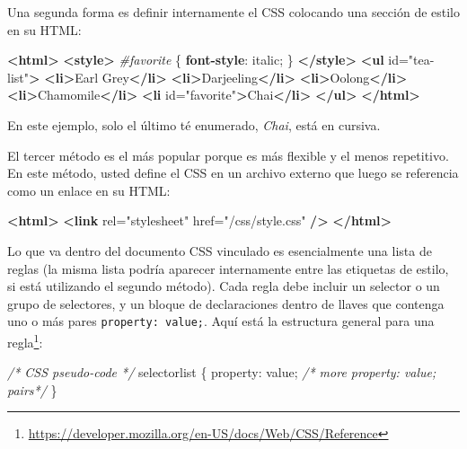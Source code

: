 \documentclass[12pt,]{krantz}
\makeatletter
\newenvironment{Shaded}{\begin{snugshade}}{\end{snugshade}}
\newcommand{\CommentTok}[1]{\textcolor[rgb]{0.56,0.35,0.01}{\textit{#1}}}
\newcommand{\DecValTok}[1]{\textcolor[rgb]{0.00,0.00,0.81}{#1}}
\newcommand{\KeywordTok}[1]{\textcolor[rgb]{0.13,0.29,0.53}{\textbf{#1}}}
\newcommand{\NormalTok}[1]{#1}
\newcommand{\OtherTok}[1]{\textcolor[rgb]{0.56,0.35,0.01}{#1}}
\newcommand{\PreprocessorTok}[1]{\textcolor[rgb]{0.56,0.35,0.01}{\textit{#1}}}
\newcommand{\StringTok}[1]{\textcolor[rgb]{0.31,0.60,0.02}{#1}}
\renewcommand{\href}[2]{#2\footnote{\url{#1}}}
\newenvironment{kframe}{%
\medskip{}
\setlength{\fboxsep}{.8em}
 \def\at@end@of@kframe{}%
 \ifinner\ifhmode%
  \def\at@end@of@kframe{\end{minipage}}%
  \begin{minipage}{\columnwidth}%
 \fi\fi%
 \def\FrameCommand##1{\hskip\@totalleftmargin \hskip-\fboxsep
 \colorbox{shadecolor}{##1}\hskip-\fboxsep
     \hskip-\linewidth \hskip-\@totalleftmargin \hskip\columnwidth}%
 \MakeFramed {\advance\hsize-\width
   \@totalleftmargin\z@ \linewidth\hsize
   \@setminipage}}%
 {\par\unskip\endMakeFramed%
 \at@end@of@kframe}
\renewenvironment{Shaded}{\begin{kframe}}{\end{kframe}}
\theoremstyle{definition}
\theoremstyle{definition}
\theoremstyle{definition}
\theoremstyle{remark}
\makeatother
\begin{document}
Una segunda forma es definir internamente el CSS colocando una sección
de estilo en su HTML:

\begin{Shaded}
\begin{Highlighting}[]
\KeywordTok{<html>}
\KeywordTok{<style>} 
\PreprocessorTok{#favorite}\NormalTok{ \{}
    \KeywordTok{font-style}\NormalTok{: }\DecValTok{italic}\NormalTok{;}
\NormalTok{\}}
\KeywordTok{</style>}
\KeywordTok{<ul}\OtherTok{ id=}\StringTok{"tea-list"}\KeywordTok{>}
  \KeywordTok{<li>}\NormalTok{Earl Grey}\KeywordTok{</li>}
  \KeywordTok{<li>}\NormalTok{Darjeeling}\KeywordTok{</li>}
  \KeywordTok{<li>}\NormalTok{Oolong}\KeywordTok{</li>}
  \KeywordTok{<li>}\NormalTok{Chamomile}\KeywordTok{</li>}
  \KeywordTok{<li}\OtherTok{ id=}\StringTok{"favorite"}\KeywordTok{>}\NormalTok{Chai}\KeywordTok{</li>}
\KeywordTok{</ul>}
\KeywordTok{</html>}
\end{Highlighting}
\end{Shaded}

En este ejemplo, solo el último té enumerado, \emph{Chai}, está en
cursiva.

El tercer método es el más popular porque es más flexible y el menos
repetitivo. En este método, usted define el CSS en un archivo externo
que luego se referencia como un enlace en su HTML:

\begin{Shaded}
\begin{Highlighting}[]
\KeywordTok{<html>}
    \KeywordTok{<link}\OtherTok{ rel=}\StringTok{"stylesheet"}\OtherTok{ href=}\StringTok{"/css/style.css"} \KeywordTok{/>}
\KeywordTok{</html>}
\end{Highlighting}
\end{Shaded}

Lo que va dentro del documento CSS vinculado es esencialmente una lista
de reglas (la misma lista podría aparecer internamente entre las
etiquetas de estilo, si está utilizando el segundo método). Cada regla
debe incluir un selector o un grupo de selectores, y un bloque de
declaraciones dentro de llaves que contenga uno o más pares
\texttt{property:\ value;}. Aquí está la
\href{https://developer.mozilla.org/en-US/docs/Web/CSS/Reference}{estructura
general para una regla}:

\begin{Shaded}
\begin{Highlighting}[]
\CommentTok{/* CSS pseudo-code */}
\NormalTok{selectorlist \{}
\NormalTok{    property: value;}
    \CommentTok{/* more property: value; pairs*/}
\NormalTok{\}}
\end{Highlighting}
\end{Shaded}
\end{document}

